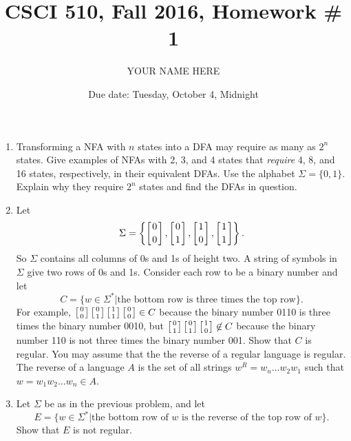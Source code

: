 \documentclass{article}
\title{CSCI 510, Fall 2016, Homework \# 1}
\author{YOUR NAME HERE}
\date{Due date: Tuesday, October 4, Midnight}
\newcommand{\duple}[2]{\left[{#1}\atop{#2}\right]}
\begin{document}
\maketitle
\begin{enumerate}
\item Transforming a NFA with $n$ states into a DFA may require as
  many as $2^n$ states.  Give examples of NFAs with 2, 3, and 4 states
  that {\em require} 4, 8, and 16 states, respectively, in their
  equivalent DFAs. Use the alphabet $\Sigma=\{0,1\}$.  Explain why
  they require $2^n$ states and find the DFAs in question.
\item
  Let
  \[
  \Sigma=\left\{\duple{0}{0},\duple{0}{1},\duple{1}{0},\duple{1}{1}\right\}.
  \]
  So $\Sigma$ contains all columns of 0s and 1s of height two.  A
  string of symbols in $\Sigma$ give two rows of 0s and 1s.  Consider
  each row to be a binary number and let
  \[
  C = \{w\in\Sigma^* | \mbox{the bottom row is three times the top
    row}\}.
  \]
  For example, $\duple 00\duple 01 \duple 11 \duple 00\in C$ because
  the binary number 0110 is three times the binary number 0010,
  but
  $\duple 01 \duple01\duple10\not\in C$ because the binary number 110
  is not three times the binary number 001.  Show that $C$ is
  regular.  You may assume that the the reverse of a regular language
  is regular.  The reverse of a language $A$ is the set of all strings
  $w^R=w_n\ldots w_2w_1$ such that $w=w_1w_2\ldots w_n\in A$.

\item Let $\Sigma$ be as in the previous problem, and let
  \[
  E=\{w\in\Sigma^*|\mbox{the bottom row of $w$ is the reverse of the
    top row of $w$}\}.
    \]
    Show that $E$ is not regular.
\end{enumerate}
\end{document}
